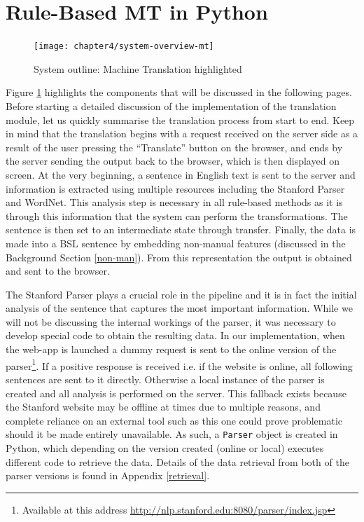 \documentclass[12pt]{ociamthesis}  %
\begin{document}
\section{Rule-Based MT in Python}
\label{RBMT}
\begin{figure}[h]
	\centering
    \texttt{[image: chapter4/system-overview-mt]}
    \caption{System outline: Machine Translation highlighted}
    \label{fig:sys-over-mt}
\end{figure}	
Figure \ref{fig:sys-over-mt} highlights the components that will be discussed in the following pages. Before starting a detailed discussion of the implementation of the translation module, let us quickly summarise the translation process from start to end. Keep in mind that the translation begins with a request received on the server side as a result of the user pressing the ``Translate'' button on the browser, and ends by the server sending the output back to the browser, which is then displayed on screen. At the very beginning, a sentence in English text is sent to the server and information is extracted using multiple resources including the Stanford Parser  and WordNet. This analysis step is necessary in all rule-based methods as it is through this information that the system can perform the transformations. The sentence is then set to an intermediate state through transfer. Finally, the data is made into a BSL sentence by embedding non-manual features (discussed in the Background Section \ref{non-man}). From this representation the output is obtained and sent to the browser.

The Stanford Parser plays a crucial role in the pipeline and it is in fact the initial analysis of the sentence that captures the most important information. While we will not be discussing the internal workings of the parser, it was necessary to develop special code to obtain the resulting data. In our implementation, when the web-app is launched a dummy request is sent to the online version of the parser\footnote{Available at this address \url{http://nlp.stanford.edu:8080/parser/index.jsp}}. If a positive response is received i.e. if the website is online, all following sentences are sent to it directly. Otherwise a local instance of the parser is created and all analysis is performed on the server. This fallback exists because the Stanford website may be offline at times due to multiple reasons, and complete reliance on an external tool such as this one could prove problematic should it be made entirely unavailable. As such, a \texttt{Parser} object is created in Python, which depending on the version created (online or local) executes different code to retrieve the data. Details of the data retrieval from both of the parser versions is found in Appendix \ref{retrieval}.
\end{document}

